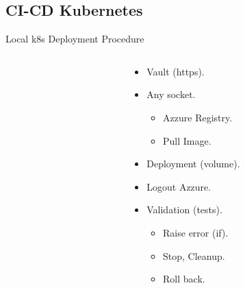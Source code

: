 \subsection{CI-CD Kubernetes}

\begin{frame}{Local k8s Deployment Procedure}
	\begin{columns}[T] %
		\begin{column}{5cm} %
		\end{column}
		\begin{column}{5cm} %
			\begin{itemize}
				\item<+-| alert@+> Vault (https).
				\item<+-| alert@+> Any socket.
					\begin{itemize}
						\item<+-| alert@+> Azzure Registry.
						\item<+-| alert@+> Pull Image.
					\end{itemize}
				\item<+-| alert@+> Deployment (volume).
				\item<+-| alert@+> Logout Azzure.
				\item<+-| alert@+> Validation (tests).
					\begin{itemize}
						\item<+-| alert@+>Raise error (if).
						\item<+-| alert@+> Stop, Cleanup.
						\item<+-| alert@+> Roll back.
					\end{itemize}
			\end{itemize}
		\end{column}
	\end{columns}
\end{frame}

